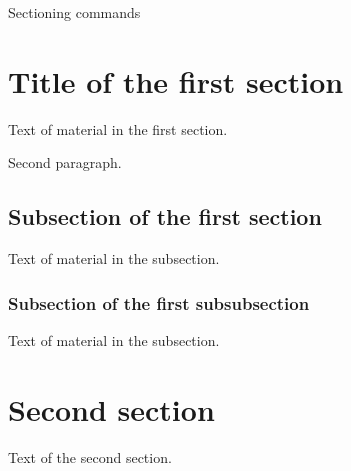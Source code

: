 \documentclass[a4paper, 12pt]{article}
\begin{document}
Sectioning commands

\section{Title of the first section}
Text of material in the first section.

Second paragraph.

\subsection{Subsection of the first section}
Text of material in the subsection.

\subsubsection{Subsection of the first subsubsection}
Text of material in the subsection.

\section{Second section}
Text of the second section.

\end{document}
